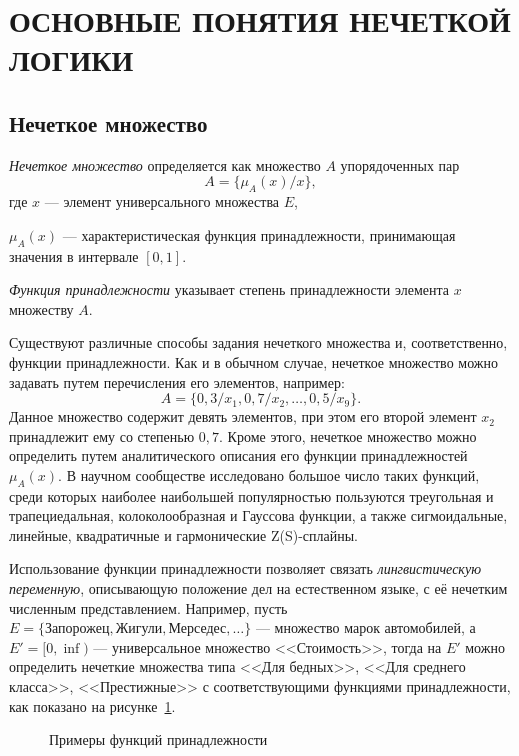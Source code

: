 \section[Основные понятия нечеткой логики]{%
  ОСНОВНЫЕ ПОНЯТИЯ НЕЧЕТКОЙ ЛОГИКИ
}

\subsection{Нечеткое множество}

\emph{Нечеткое множество} определяется как множество \( A \) упорядоченных пар
\[
A = \{ \mu_A(x) / x \},
\]
где
\( x \) --- элемент универсального множества \( E \), \par
\hspace{-7mm} \( \mu_A(x) \) --- характеристическая функция принадлежности,
принимающая значения в интервале \( [0, 1] \).

\emph{Функция принадлежности} указывает степень принадлежности
элемента \( x \) множеству \( A \).

Существуют различные способы задания нечеткого множества и,
соответственно, функции принадлежности. Как и в обычном случае,
нечеткое множество можно задавать путем перечисления его элементов, например:
\[
  A = \{ 0{,}3/x_1, 0{,}7/x_2, \ldots, 0{,}5/x_9 \}.
\]
Данное множество содержит девять элементов, при этом его второй элемент \( x_2 \)
принадлежит ему со степенью \( 0{,}7 \).
Кроме этого, нечеткое множество можно определить путем аналитического описания его
функции принадлежностей \( \mu_A(x) \).
В научном сообществе исследовано большое число таких функций,
среди которых наиболее наибольшей популярностью пользуются
треугольная и трапециедальная, колоколообразная и Гауссова функции,
а также сигмоидальные, линейные,
квадратичные и гармонические Z(S)-сплайны\cite{fuzzy_bstu_22}.

Использование функции принадлежности позволяет связать
\emph{лингвистическую переменную}, описывающую положение дел на естественном языке,
с её нечетким численным представлением.
Например, пусть
\( E = \{ \text{Запорожец}, \text{Жигули}, \text{Мерседес}, \ldots \} \) ---
множество марок автомобилей, а
\( E' = [0, \inf) \) --- универсальное множество <<Стоимость>>,
тогда на \( E' \) можно определить нечеткие множества типа
<<Для бедных>>, <<Для среднего класса>>, <<Престижные>> с
соответствующими функциями принадлежности,
как показано на рисунке~\ref{fig:example_functions}.

\begin{figure}[h!]
  \centering
  \caption{Примеры функций принадлежности}
  \label{fig:example_functions}
\end{figure}

